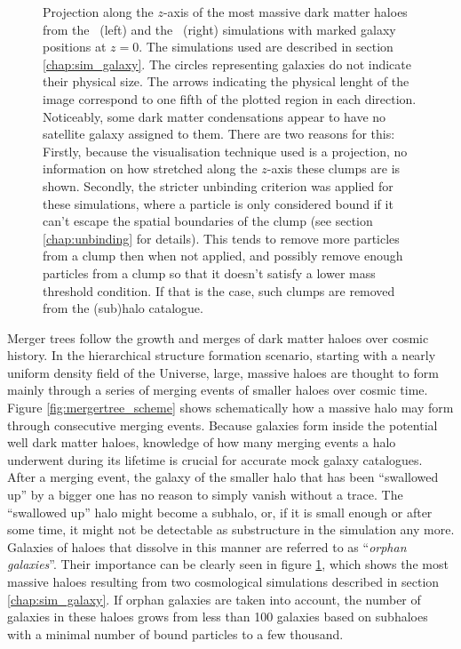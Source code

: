 \begin{figure}[p]
    \endminipage
    \caption{Projection along the $z$-axis of the most massive dark matter haloes from the \gsmall\ (left) and the \glarge\ (right)
        simulations with marked galaxy positions at $z=0$.
        The simulations used are described in section \ref{chap:sim_galaxy}.
        The circles representing galaxies do not indicate their physical size.
        The arrows indicating the physical lenght of the image correspond to one fifth of the plotted region in each direction.\\
        Noticeably, some dark matter condensations appear to have no satellite galaxy assigned to them.
        There are two reasons for this: Firstly, because the visualisation technique used is a projection, no information on how stretched along the $z$-axis these clumps are is shown.
        Secondly, the stricter unbinding criterion was applied for these simulations, where a particle is only considered bound if it can't escape the spatial boundaries of the clump (see section \ref{chap:unbinding} for details).
        This tends to remove more particles from a clump then when not applied, and possibly remove enough particles from a clump so that it doesn't satisfy a lower mass threshold condition.
        If that is the case, such clumps are removed from the (sub)halo catalogue.
    }
    \label{fig:galaxies_in_halo}
\end{figure}


Merger trees follow the growth and merges of dark matter haloes over cosmic history.
In the hierarchical structure formation scenario, starting with a nearly uniform density field of the Universe, large, massive haloes are thought to form mainly through a series of merging events of smaller haloes over cosmic time.
Figure \ref{fig:mergertree_scheme} shows schematically how a massive halo may form through consecutive merging events.
Because galaxies form inside the potential well dark matter haloes, knowledge of how many merging events a halo underwent during its lifetime is crucial for accurate mock galaxy catalogues.
After a merging event, the galaxy of the smaller halo that has been ``swallowed up'' by a bigger one has no reason to simply vanish without a trace. 
The ``swallowed up'' halo might become a subhalo, or, if it is small enough or after some time, it might not be detectable as substructure in the simulation any more.
Galaxies of haloes that dissolve in this manner are referred to as ``\emph{orphan galaxies}''.
Their importance can be clearly seen in figure \ref{fig:galaxies_in_halo}, which shows the most massive haloes resulting from two cosmological simulations described in section \ref{chap:sim_galaxy}.
If orphan galaxies are taken into account, the number of galaxies in these haloes grows from less than 100 galaxies based on subhaloes with a minimal number of bound particles to a few thousand.


